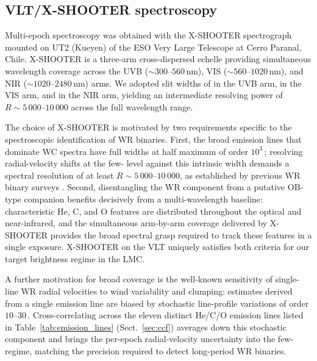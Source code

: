 \subsection{VLT/X-SHOOTER spectroscopy}
\label{sec:xshooter}

Multi-epoch spectroscopy was obtained with the X-SHOOTER spectrograph
\citep{Vernet2011} mounted on UT2 (Kueyen) of the ESO Very Large
Telescope at Cerro Paranal, Chile. X-SHOOTER is a three-arm
cross-dispersed echelle providing simultaneous wavelength coverage
across the UVB ($\sim 300$--$560$\,nm), VIS ($\sim 560$--$1020$\,nm),
and NIR ($\sim 1020$--$2480$\,nm) arms. We adopted slit widths of
\slitUVB in the UVB arm, \slitVIS in the VIS arm, and \slitNIR in the
NIR arm, yielding
an intermediate resolving power of $R \sim 5\,000$--$10\,000$ across the
full wavelength range.

The choice of X-SHOOTER is motivated by two requirements specific to
the spectroscopic identification of WR binaries. First, the broad
emission lines that dominate WC spectra have full widths at half maximum
of order $10^{3}$\,\kms; resolving radial-velocity shifts at the few-\kms
level against this intrinsic width demands a spectral resolution of at
least $R \sim 5\,000$--$10\,000$, as established by previous WR binary
surveys \citep[e.g.][]{Bartzakos2001,Dsilva2022}.
Second, disentangling the WR component from a putative OB-type companion
benefits decisively from a multi-wavelength baseline: characteristic He,
C, and O features are distributed throughout the optical and near-infrared,
and the simultaneous arm-by-arm coverage delivered by X-SHOOTER provides
the broad spectral grasp required to track these features in a single
exposure. X-SHOOTER on the VLT uniquely satisfies both criteria for our
target brightness regime in the LMC.

A further motivation for broad coverage is the well-known sensitivity of
single-line WR radial velocities to wind variability and clumping:
estimates derived from a single emission line are biased by stochastic
line-profile variations of order $10$--$30$\,\kms. Cross-correlating across the eleven distinct He/C/O
emission lines listed in Table~\ref{tab:emission_lines}
(Sect.~\ref{sec:ccf}) averages down this stochastic component and brings
the per-epoch radial-velocity uncertainty into the few-\kms regime,
matching the precision required to detect long-period WR binaries.

